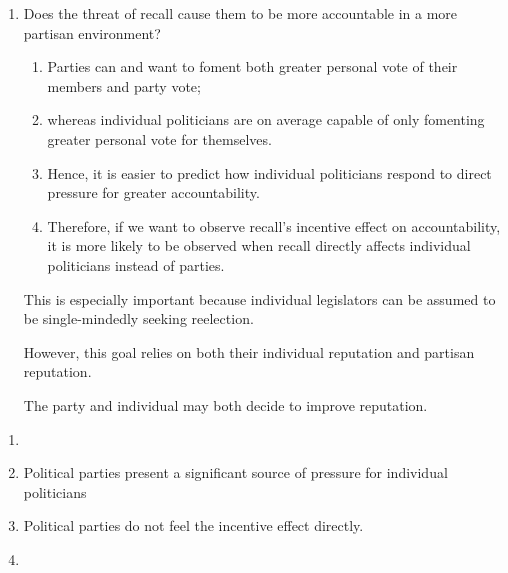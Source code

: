 \documentclass[hyphens, crop=false]{standalone}
\begin{document}
\begin{enumerate}
%				
%				
%			
%			
%			
		
		\item 
		Does the threat of recall cause them to be more accountable in a more partisan environment?
		
		\begin{enumerate}
			\item Parties can and want to foment both greater personal vote of their members and party vote;
			\item
			whereas individual politicians are on average capable of only fomenting greater personal vote for themselves.
			\item
			Hence,
			it is easier to predict how individual politicians respond to direct pressure for greater accountability.
			\item 
			Therefore, if we want to observe recall's incentive effect on accountability,
			it is more likely to be observed when recall directly affects individual politicians instead of parties.
		\end{enumerate}
		
		
		
		
		This is especially important because individual legislators can be assumed to be single-mindedly seeking reelection.
		
		However, this goal relies on both their individual reputation and partisan reputation.
		
		The party and individual may both decide to improve reputation.
		
	\end{enumerate}
	
	
	\begin{enumerate}
		\item 
		\item 
		Political parties present a significant source of pressure for individual politicians
		\item 
		Political parties do not feel the incentive effect directly.
		\item 
		
	\end{enumerate}
	
\end{document}
